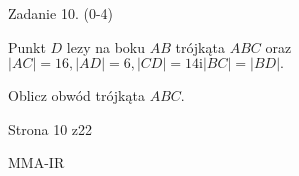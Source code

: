\documentclass[a4paper,12pt]{article}
\begin{document}
Zadanie 10. (0-4)

Punkt $D$ lezy na boku $AB$ trójkąta $ABC$ oraz $|AC|=16, |AD|=6, |CD|=14 \mathrm{i} |BC|=|BD|.$

Oblicz obwód trójkąta $ABC.$

Strona 10 z22

MMA-IR
\end{document}
